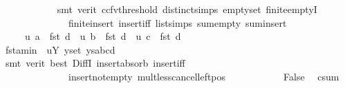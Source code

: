 \begin{isabellebody}
\ \ \ \ \ \ \ \ \ \ \isamarkupfalse%
\ {\isacharparenleft}{\kern0pt}smt\ {\isacharparenleft}{\kern0pt}verit{\isacharcomma}{\kern0pt}\ ccfv{\isacharunderscore}{\kern0pt}threshold{\isacharparenright}{\kern0pt}\ distinct{\isachardot}{\kern0pt}simps{\isacharparenleft}{\kern0pt}{}{\isacharparenright}{\kern0pt}\ empty{\isacharunderscore}{\kern0pt}set\ finite{\isachardot}{\kern0pt}emptyI\isanewline
\ \ \ \ \ \ \ \ \ \ \ \ \ \ finite{\isacharunderscore}{\kern0pt}insert\ insert{\isacharunderscore}{\kern0pt}iff\ list{\isachardot}{\kern0pt}simps{\isacharparenleft}{\kern0pt}{}{}{\isacharparenright}{\kern0pt}\ sum{\isachardot}{\kern0pt}empty\ sum{\isachardot}{\kern0pt}insert{\isacharparenright}{\kern0pt}\isanewline
\isanewline
\ \ \ \ \ \ \ \ \isamarkupfalse%
\ \isamarkupfalse%
\ {\isachardoublequoteopen}\ {\isachardot}{\kern0pt}{\isachardot}{\kern0pt}{\isachardot}{\kern0pt}\ {\isacharless}{\kern0pt}\ \ u\ a\ {\isacharasterisk}{\kern0pt}\ {\isacharparenleft}{\kern0pt}fst\ d{\isacharparenright}{\kern0pt}\ {\isacharplus}{\kern0pt}\ u\ b\ {\isacharasterisk}{\kern0pt}\ {\isacharparenleft}{\kern0pt}fst\ d{\isacharparenright}{\kern0pt}\ {\isacharplus}{\kern0pt}\ u\ c\ {\isacharasterisk}{\kern0pt}\ {\isacharparenleft}{\kern0pt}fst\ d{\isacharparenright}{\kern0pt}{\isachardoublequoteclose}\ \isanewline
\ \ \ \ \ \ \ \ \ \ \isamarkupfalse%
\ fst{\isacharunderscore}{\kern0pt}a{\isacharunderscore}{\kern0pt}min\ {\isachardoublequoteopen}{}{}{\isachardoublequoteclose}\ uY{\isacharparenleft}{\kern0pt}{}{\isacharparenright}{\kern0pt}\ y{\isacharunderscore}{\kern0pt}set\ ys{\isacharunderscore}{\kern0pt}abcd\isanewline
\ \ \ \ \ \ \ \ \ \ \isamarkupfalse%
\ {\isacharparenleft}{\kern0pt}smt\ {\isacharparenleft}{\kern0pt}verit{\isacharcomma}{\kern0pt}\ best{\isacharparenright}{\kern0pt}\ DiffI\ insert{\isacharunderscore}{\kern0pt}absorb\ insert{\isacharunderscore}{\kern0pt}iff\isanewline
\ \ \ \ \ \ \ \ \ \ \ \ \ \ insert{\isacharunderscore}{\kern0pt}not{\isacharunderscore}{\kern0pt}empty\ mult{\isacharunderscore}{\kern0pt}less{\isacharunderscore}{\kern0pt}cancel{\isacharunderscore}{\kern0pt}left{\isacharunderscore}{\kern0pt}pos{\isacharparenright}{\kern0pt}\isanewline
\isanewline
\ \ \ \ \ \ \ \ \isamarkupfalse%
\ \isamarkupfalse%
\ False\ \isamarkupfalse%
\ c{\isacharunderscore}{\kern0pt}sum\isanewline
\ \ \ \ \ \ \ \ \ \ \isamarkupfalse%

\end{isabellebody}
